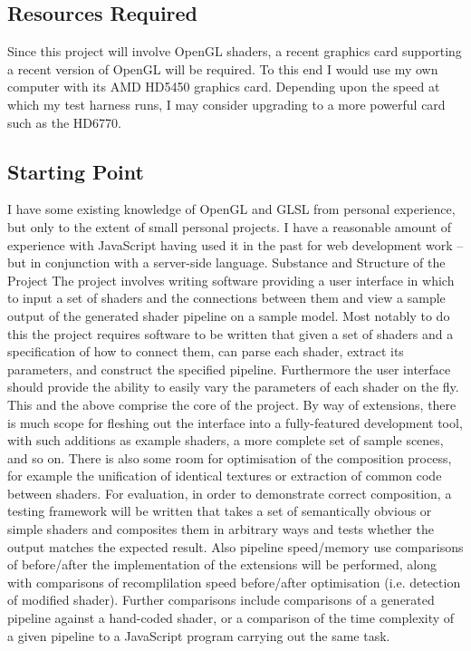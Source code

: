 \subsection{Resources Required}
Since this project will involve OpenGL shaders, a recent graphics card supporting a recent version
of OpenGL will be required. To this end I would use my own computer with its AMD HD5450
graphics card. Depending upon the speed at which my test harness runs, I may consider upgrading
to a more powerful card such as the HD6770.

\subsection{Starting Point}
I have some existing knowledge of OpenGL and GLSL from personal experience, but only to the
extent of small personal projects. I have a reasonable amount of experience with JavaScript having
used it in the past for web development work – but in conjunction with a server-side language.
Substance and Structure of the Project
The project involves writing software providing a user interface in which to input a set of shaders
and the connections between them and view a sample output of the generated shader pipeline on a
sample model.
Most notably to do this the project requires software to be written that given a set of shaders and a
specification of how to connect them, can parse each shader, extract its parameters, and construct
the specified pipeline.
Furthermore the user interface should provide the ability to easily vary the parameters of each
shader on the fly. This and the above comprise the core of the project.
By way of extensions, there is much scope for fleshing out the interface into a fully-featured
development tool, with such additions as example shaders, a more complete set of sample scenes,
and so on. There is also some room for optimisation of the composition process, for example the
unification of identical textures or extraction of common code between shaders.
For evaluation, in order to demonstrate correct composition, a testing framework will be written that
takes a set of semantically obvious or simple shaders and composites them in arbitrary ways and
tests whether the output matches the expected result. Also pipeline speed/memory use comparisons
of before/after the implementation of the extensions will be performed, along with comparisons of
recomplilation speed before/after optimisation (i.e. detection of modified shader). Further
comparisons include comparisons of a generated pipeline against a hand-coded shader, or a
comparison of the time complexity of a given pipeline to a JavaScript program carrying out the
same task.


